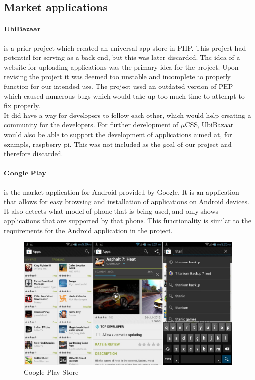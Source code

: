 \subsection{Market applications}
\paragraph{UbiBazaar} is a prior project which created an universal app store in PHP. This project had potential for serving as a back end, but this was later discarded. The idea of a website for uploading applications was the primary idea for the project. Upon revising the project it was deemed too unstable and incomplete to properly function for our intended use. The project used an outdated version of PHP which caused numerous bugs which would take up too much time to attempt to fix properly.\\

It did have a way for developers to follow each other, which would help creating a community for the developers. For further development of $\mu$CSS, UbiBazaar would also be able to support the development of applications aimed at, for example, raspberry pi. This was not included as the goal of our project and therefore discarded.

\paragraph{Google Play} is the market application for Android provided by Google. It is an application that allows for easy browsing and installation of applications on Android devices. It also detects what model of phone that is being used, and only shows applications that are supported by that phone. This functionality is similar to the requirements for the Android application in the project.

\begin{figure}[H]
\includegraphics[scale=0.2]{images/Google-Play-Store-APK-3-7-15.jpg}
\caption{Google Play Store}
\end{figure}

